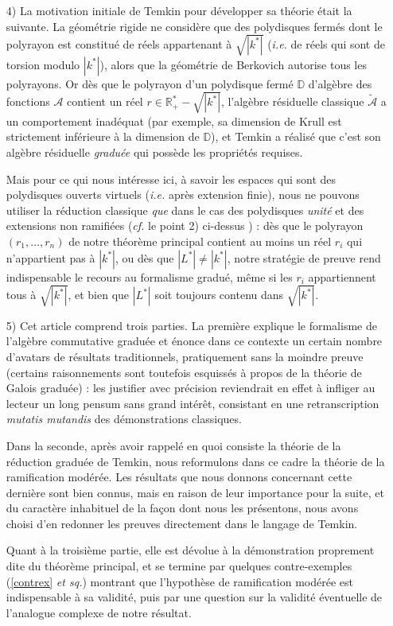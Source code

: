 \documentclass[10pt,leqno]{article}
\renewcommand{\Bbb}{\mathbb}
\renewcommand{\cal}{\mathscr}
\newcommand{\RR}{{\Bbb R}}
\newcommand{\DD}{{\Bbb D}}
\newcommand{\red}{\widetilde}
\begin{document}
\begin{itemize}
\medskip
\item[4)] La motivation initiale de Temkin pour développer sa théorie était la suivante. La géométrie rigide ne considère que des polydisques fermés dont le polyrayon est constitué de réels appartenant à $\sqrt{|k^*|}$ ({\em i.e.} de réels qui sont de torsion modulo $|k^*|$), alors que la géométrie de Berkovich autorise tous les polyrayons. Or dès que le polyrayon d'un polydisque fermé $\DD$ d'algèbre des fonctions $\cal A$ contient un réel $r\in \RR^*_+-\sqrt{|k^*|}$, l'algèbre résiduelle classique $\red{\cal A}$ a un comportement inadéquat (par exemple, sa dimension de Krull est strictement inférieure à la dimension de $\DD$), et Temkin a réalisé que c'est son algèbre résiduelle {\em graduée} qui possède les propriétés requises. 

\medskip
Mais pour ce qui nous intéresse ici, à savoir les espaces qui sont des polydisques ouverts virtuels ({\em i.e.} après extension finie), nous ne pouvons utiliser la réduction classique {\em que} dans le cas des polydisques {\em unité} et des extensions non ramifiées ({\em cf.} le point 2) ci-dessus ) : dès que le polyrayon $(r_1,\ldots,r_n)$ de notre théorème principal contient au moins un réel $r_i$ qui n'appartient pas à $|k^*|$, ou dès que $|L^*|\neq |k^*|$, notre stratégie de preuve rend indispensable le recours au formalisme gradué, même si les $r_i$ appartiennent tous à $\sqrt {|k^*|}$, et bien que $|L^*|$ soit toujours contenu dans $\sqrt {|k^*|}$. 

\medskip
\item[5)] Cet article comprend trois parties. La première explique le formalisme de l'algèbre commutative graduée et énonce dans ce contexte un certain nombre d'avatars de résultats traditionnels, pratiquement sans la moindre preuve (certains raisonnements sont toutefois esquissés à propos de la théorie de Galois graduée) : les justifier avec précision reviendrait en effet à infliger au lecteur un long pensum sans grand intérêt, consistant en une retranscription {\em mutatis mutandis} des démonstrations classiques. 


\medskip
Dans la seconde, après avoir rappelé en quoi consiste la théorie de la réduction graduée de Temkin, nous reformulons dans ce cadre la théorie de la ramification modérée. Les résultats que nous donnons concernant cette dernière sont bien connus, mais en raison de leur importance pour la suite, et du caractère inhabituel de la façon dont nous les présentons, nous avons choisi d'en redonner les preuves directement dans le langage de Temkin.

\medskip
 Quant à la troisième partie, elle est dévolue à la démonstration proprement dite du théorème principal, et se termine par quelques contre-exemples (\ref{contrex} {\em et sq.}) montrant que l'hypothèse de ramification modérée est indispensable à sa validité, puis par une question sur la validité éventuelle de l'analogue complexe de notre résultat. 


\end{itemize}
\end{document}
